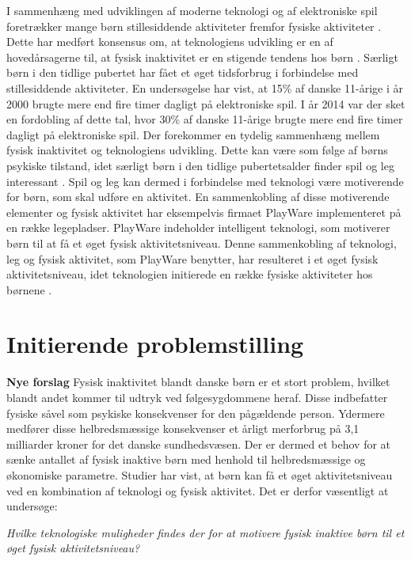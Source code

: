 I sammenhæng med udviklingen af moderne teknologi og af elektroniske spil foretrækker mange børn stillesiddende aktiviteter fremfor fysiske aktiviteter \citep{Universitet2014}. Dette har medført konsensus om, at teknologiens udvikling er en af hovedårsagerne til, at fysisk inaktivitet er en stigende tendens hos børn \citep{Kiens2007}.
Særligt børn i den tidlige pubertet har fået et øget tidsforbrug i forbindelse med stillesiddende aktiviteter. En undersøgelse har vist, at 15\% af danske 11-årige i år 2000 brugte mere end fire timer dagligt på elektroniske spil. I år 2014 var der sket en fordobling af dette tal, hvor 30\% af danske 11-årige brugte mere end fire timer dagligt på elektroniske spil. \citep{Universitet2014} \newline
Der forekommer en tydelig sammenhæng mellem fysisk inaktivitet og teknologiens udvikling. Dette kan være som følge af børns psykiske tilstand, idet særligt børn i den tidlige pubertetsalder finder spil og leg interessant \citep{Wied2011}. Spil og leg kan dermed i forbindelse med teknologi være motiverende for børn, som skal udføre en aktivitet. En sammenkobling af disse motiverende elementer og fysisk aktivitet har eksempelvis firmaet PlayWare implementeret på en række legepladser. PlayWare indeholder intelligent teknologi, som motiverer børn til at få et øget fysisk aktivitetsniveau. Denne sammenkobling af teknologi, leg og fysisk aktivitet, som PlayWare benytter, har resulteret i et øget fysisk aktivitetsniveau, idet teknologien initierede en række fysiske aktiviteter hos børnene \citep{Rishoej2010}. 

\section{Initierende problemstilling}
\textbf{Nye forslag}
Fysisk inaktivitet blandt danske børn er et stort problem, hvilket blandt andet kommer til udtryk ved følgesygdommene heraf. Disse indbefatter fysiske såvel som psykiske konsekvenser for den pågældende person. Ydermere medfører disse helbredsmæssige konsekvenser et årligt merforbrug på 3,1 milliarder kroner for det danske sundhedsvæsen. Der er dermed et behov for at sænke antallet af fysisk inaktive børn med henhold til helbredsmæssige og økonomiske parametre. Studier har vist, at børn kan få et øget aktivitetsniveau ved en kombination af teknologi og fysisk aktivitet. Det er derfor væsentligt at undersøge: 

\begin{center}
\textit{Hvilke teknologiske muligheder findes der for at motivere fysisk inaktive børn til et øget fysisk aktivitetsniveau?}
\end{center}